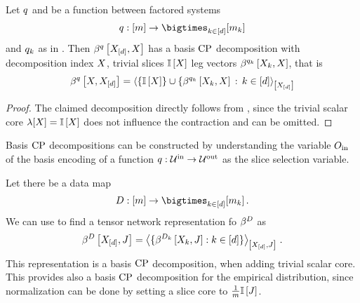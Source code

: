 \begin{theorem}
    \label{the:functionDecompositionBasisCP}
    Let $q$ and be a function between factored systems
    \begin{align*}
        \exfunction : [\catdim] \rightarrow  \facstates
    \end{align*}
    and $q_{k}$ as in .
    Then $\bencodingofat{\exfunction}{\shortcatvariables,\catvariable}$ has a basis $\mathrm{CP}$ decomposition with decomposition index $X$, trivial slices $\mathbb{I}\left[X\right]$ leg vectors $\bencodingofat{\exfunctionof{\catenumerator}}{\catvariableof{\catenumerator},\catvariable}$, that is
    \begin{align*}
        \bencodingofat{\exfunction}{\catvariable,\shortcatvariables}
        = \contractionof{\{\onesat{\catvariable}\} \cup \{\bencodingofat{\exfunctionof{\catenumerator}}{\catvariableof{\catenumerator},\catvariable}\,:\,\catenumeratorin}{\shortcatvariables}
    \end{align*}
\end{theorem}
\begin{proof}
    The claimed decomposition directly follows from , since the trivial scalar core $\lambda[X]=\mathbb{I}\left[X\right]$ does not influence the contraction and can be omitted.
\end{proof}

Basis $\mathrm{CP}$ decompositions can be constructed by understanding the variable $O_{\mathrm{in}}$ of the basis encoding of a function $q:\mathcal{U}^{\mathrm{in}} \rightarrow \mathcal{U}^{\mathrm{out}}$ as the slice selection variable.

\begin{example}
    \label{exa:empDistCP}
    Let there be a data map
    \begin{align*}
        \datamap : [\datanum] \rightarrow \facstates \, .
    \end{align*}
    We can use  to find a tensor network representation fo $\beta^{D}$ as
    \begin{align*}
        \bencodingofat{\datamap}{\shortcatvariables,\datvariable}
        = \contractionof{
            \{\bencodingofat{\datamapof{\atomenumerator}}{\catvariableof{\atomenumerator},\datvariable} : \atomenumeratorin \}
        }{\shortcatvariables,\datvariable} \, .
    \end{align*}
    This representation is a basis $\mathrm{CP}$ decomposition, when adding trivial scalar core.
    This provides also a basis $\mathrm{CP}$ decomposition for the empirical distribution, since normalization can be done by setting a slice core to $\frac{1}{m}\mathbb{I}\left[J\right]$.
\end{example}

